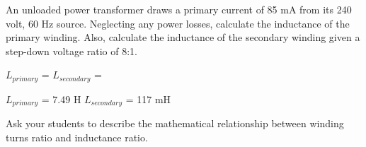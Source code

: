 

An unloaded power transformer draws a primary current of 85 mA from its 240 volt, 60 Hz source.  Neglecting any power losses, calculate the inductance of the primary winding.  Also, calculate the inductance of the secondary winding given a step-down voltage ratio of 8:1.

\vskip 10pt

$L_{primary}$ = \hskip 80pt $L_{secondary}$ =

\vskip 10pt







$L_{primary}$ = 7.49 H \hskip 80pt $L_{secondary}$ = 117 mH







Ask your students to describe the mathematical relationship between winding turns ratio and inductance ratio.





